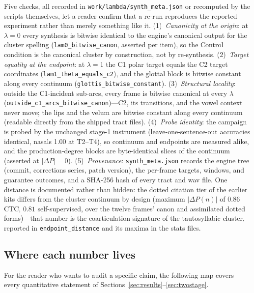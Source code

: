 \documentclass[11pt,a4paper]{article}
\newcommand{\sampa}[1]{\texttt{#1}}
\newcommand{\lam}{\lambda}
\begin{document}
Five checks, all recorded in \sampa{work/lambda/synth\_meta.json} or
recomputed by the scripts themselves, let a reader confirm that a
re-run reproduces the reported experiment rather than merely
something like it. (1)~\emph{Canonicity at the origin}: at $\lam=0$
every synthesis is bitwise identical to the engine's canonical output
for the cluster spelling (\sampa{lam0\_bitwise\_canon}, asserted per
item), so the Control condition is the canonical cluster by
construction, not by re-synthesis. (2)~\emph{Target equality at the
endpoint}: at $\lam=1$ the C1 polar target equals the C2 target
coordinates (\sampa{lam1\_theta\_equals\_c2}), and the glottal block
is bitwise constant along every continuum
(\sampa{glottis\_bitwise\_constant}). (3)~\emph{Structural locality}:
outside the C1-incident sub-arcs, every frame is bitwise canonical at
every $\lam$ (\sampa{outside\_c1\_arcs\_bitwise\_canon})---C2, its
transitions, and the vowel context never move; the lips and the velum
are bitwise constant along every continuum (readable directly from
the shipped tract files). (4)~\emph{Probe identity}: the campaign is
probed by the unchanged stage-1 instrument (leave-one-sentence-out
accuracies identical, nasals 1.00 at T2--T4), so continuum and
endpoints are measured alike, and the production-degree blocks are
byte-identical slices of the continuum (asserted at
$|{\Delta}P| = 0$). (5)~\emph{Provenance}: \sampa{synth\_meta.json}
records the engine tree (commit, corrections series, patch version),
the per-frame targets, windows, and guarantee outcomes, and a SHA-256
hash of every tract and wav file. One distance is documented rather
than hidden: the dotted citation tier of the earlier kits differs
from the cluster continuum by design (maximum $|{\Delta}P(n)|$ of
$0.86$ CTC, $0.81$ self-supervised, over the twelve frames' canon and
assimilated dotted forms)---that number is the coarticulation
signature of the tautosyllabic cluster, reported in
\sampa{endpoint\_distance} and its maxima in the stats files.

\subsection{Where each number lives}

For the reader who wants to audit a specific claim, the following
map covers every quantitative statement of
Sections~\ref{sec:results}--\ref{sec:twostage}.
\end{document}
